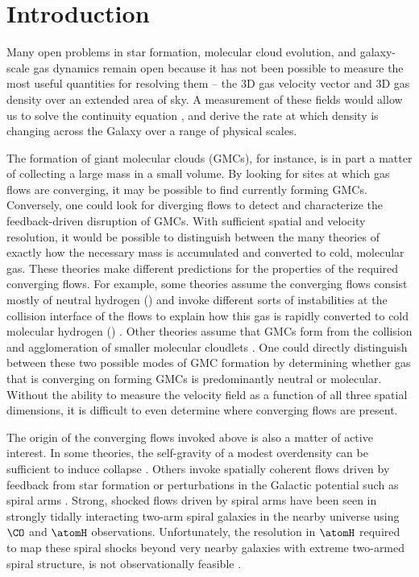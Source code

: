 \section{Introduction}
Many open problems in star formation, molecular cloud evolution, and galaxy-scale gas dynamics remain open because it has not been possible to measure the most useful quantities for resolving them -- the 3D gas velocity vector and 3D gas density over an extended area of sky. A measurement of these fields would allow us to solve the continuity equation \citep{euler1757principes}, and derive the rate at which density is changing across the Galaxy over a range of physical scales. 

The formation of giant molecular clouds (GMCs), for instance, is in part a matter of collecting a large mass in a small volume. 
By looking for sites at which gas flows are converging, it may be possible to find currently forming GMCs.
Conversely, one could look for diverging flows to detect and characterize the feedback-driven disruption of GMCs.
With sufficient spatial and velocity resolution, it would be possible to distinguish between the many theories of exactly how the necessary mass is accumulated and converted to cold, molecular gas. 
These theories make different predictions for the properties of the required converging flows.
For example, some theories assume the converging flows consist mostly of neutral hydrogen (\atomH) and invoke different sorts of instabilities at the collision interface of the flows to explain how this gas is rapidly converted to cold molecular hydrogen (\molH) \citep[e.g. ][]{Heitsch06,Clark:2012bq,2014ApJ...790...37C}.
Other theories assume that GMCs form from the collision and agglomeration of smaller molecular cloudlets \citep[e.g. ][]{Roberts:1987eb,Dobbs:2008ez,Tasker:2009gc}. 
One could directly distinguish between these two possible modes of GMC formation by determining whether gas that is converging on forming GMCs is predominantly neutral or molecular.
Without the ability to measure the velocity field as a function of all three spatial dimensions, it is difficult to even determine where converging flows are present.

The origin of the converging flows invoked above is also a matter of active interest.
In some theories, the self-gravity of a modest overdensity can be sufficient to induce collapse \citep{Kim:2002da,VazquezSemadeni:2007cj,2012MNRAS.425.2157D}.
Others invoke spatially coherent flows driven by feedback from star formation \citep{Fujimoto:2014kh} or perturbations in the Galactic potential such as spiral arms \citep{Roberts:1972bp,Bonnell:2006hn}.
Strong, shocked flows driven by spiral arms have been seen in strongly tidally interacting two-arm spiral galaxies in the nearby universe \citep{Visser:1980ud,Visser:1980vc,Shetty_2007} using $\CO$ and $\atomH$ observations.
Unfortunately, the resolution in $\atomH$ required to map these spiral shocks beyond very nearby galaxies with extreme two-armed spiral structure, is not observationally feasible \citep{Visser:1980ud}.

